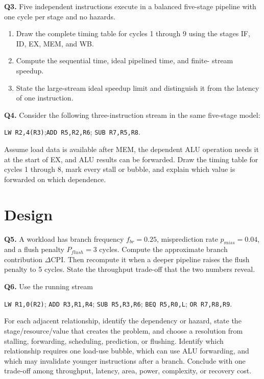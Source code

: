 \documentclass[11pt]{article}
\begin{document}
\textbf{Q3.} Five independent instructions execute in a balanced five-stage
pipeline with one cycle per stage and no hazards.
\begin{enumerate}
  \item[(a)] Draw the complete timing table for cycles 1 through 9 using the
        stages IF, ID, EX, MEM, and WB.
  \item[(b)] Compute the sequential time, ideal pipelined time, and finite-
        stream speedup.
  \item[(c)] State the large-stream ideal speedup limit and distinguish it
        from the latency of one instruction.
\end{enumerate}

\textbf{Q4.} Consider the following three-instruction stream in the same
five-stage model:
\begin{center}
\texttt{LW R2,4(R3)};\quad \texttt{ADD R5,R2,R6};\quad
\texttt{SUB R7,R5,R8}.
\end{center}
Assume load data is available after MEM, the dependent ALU operation needs it
at the start of EX, and ALU results can be forwarded. Draw the timing table
for cycles 1 through 8, mark every stall or bubble, and explain which value is
forwarded on which dependence.

\section{Design}

\textbf{Q5.} A workload has branch frequency $f_{br}=0.25$, misprediction rate
$p_{miss}=0.04$, and a flush penalty $P_{flush}=3$ cycles. Compute the
approximate branch contribution $\Delta\mathrm{CPI}$. Then recompute it when
a deeper pipeline raises the flush penalty to 5 cycles. State the throughput
trade-off that the two numbers reveal.

\textbf{Q6.} Use the running stream
\begin{center}
\texttt{LW R1,0(R2)}; \texttt{ADD R3,R1,R4}; \texttt{SUB R5,R3,R6};
\texttt{BEQ R5,R0,L}; \texttt{OR R7,R8,R9}.
\end{center}
For each adjacent relationship, identify the dependency or hazard, state the
stage/resource/value that creates the problem, and choose a resolution from
stalling, forwarding, scheduling, prediction, or flushing. Identify which
relationship requires one load-use bubble, which can use ALU forwarding, and
which may invalidate younger instructions after a branch. Conclude with one
trade-off among throughput, latency, area, power, complexity, or recovery cost.



\end{document}
